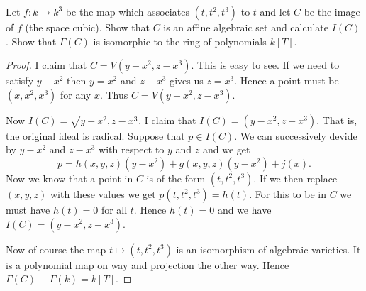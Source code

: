 \documentclass{article}
\begin{document}
\begin{problem}
  Let $f:k\rightarrow k^3$ be the map which associates $(t,t^2,t^3)$ to $t$
  and let $C$ be the image of $f$ (the space cubic). Show that $C$ is an
  affine algebraic set and calculate $I(C)$. Show that $\Gamma(C)$ is
  isomorphic to the ring of polynomials $k[T]$.
  \begin{proof}
    I claim that $C=V(y-x^2,z-x^3)$. This is easy to see. If we need to satisfy
    $y-x^2$ then $y=x^2$ and $z-x^3$ gives us $z=x^3$. Hence a point must be
    $(x,x^2,x^3)$ for any $x$. Thus $C=V(y-x^2,z-x^3)$. 

    Now $I(C)=\sqrt{y-x^2,z-x^3}$. I claim that $I(C)=(y-x^2,z-x^3)$. That is,
    the original ideal is radical. Suppose that $p\in I(C)$. We can successively
    devide by $y-x^2$ and $z-x^3$ with respect to $y$ and $z$ and we get
    \[p=h(x,y,z)(y-x^2)+g(x,y,z)(y-x^2)+j(x).\]
    Now we know that a point in $C$ is of the form $(t,t^2,t^3)$. If we then
    replace $(x,y,z)$ with these values we get $p(t,t^2,t^3)=h(t)$. For this to
    be in $C$ we must have $h(t)=0$ for all $t$. Hence $h(t)=0$ and we have
    $I(C)=(y-x^2,z-x^3)$.
    
    Now of course the map $t\mapsto(t,t^2,t^3)$ is an isomorphism of algebraic
    varieties. It is a polynomial map on way and projection the other way.
    Hence $\Gamma(C)\equiv\Gamma(k)=k[T]$.
  \end{proof}
\end{problem}
\end{document}
